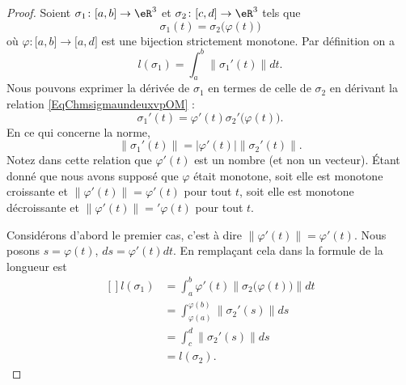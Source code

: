 \begin{proof}
    Soient $\sigma_1\colon \mathopen[ a , b \mathclose]\to \eR^3$ et $\sigma_2\colon \mathopen[ c , d \mathclose]\to \eR^3$ tels que
    \begin{equation}     \label{EqChmsigmaundeuxvpOM}
        \sigma_1(t)=\sigma_2\big( \varphi(t) \big)
    \end{equation}
    où $\varphi\colon \mathopen[ a , b \mathclose]\to \mathopen[ a , d \mathclose]$ est une bijection strictement monotone. Par définition on a
    \begin{equation}
        l(\sigma_1)=\int_a^b\| \sigma_1'(t) \|dt.
    \end{equation}
    Nous pouvons exprimer la dérivée de $\sigma_1$ en termes de celle de $\sigma_2$ en dérivant la relation \eqref{EqChmsigmaundeuxvpOM} :
    \begin{equation}
        \sigma_1'(t)=\varphi'(t)\sigma_2'\big( \varphi(t) \big).
    \end{equation}
    En ce qui concerne la norme,
    \begin{equation}
        \| \sigma_1'(t) \|=| \varphi'(t) |\| \sigma_2'(t) \|.
    \end{equation}
    Notez dans cette relation que $\varphi'(t)$ est un nombre (et non un vecteur). Étant donné que nous avons supposé que $\varphi$ était monotone, soit elle est monotone croissante et $\| \varphi'(t) \|=\varphi'(t)$ pour tout $t$, soit elle est monotone décroissante et $\| \varphi'(t) \|='\varphi(t)$ pour tout $t$.

    Considérons d'abord le premier cas, c'est à dire $\| \varphi'(t) \|=\varphi'(t)$. Nous posons $s=\varphi(t)$, $ds=\varphi'(t)dt$. En remplaçant cela dans la formule de la longueur est
    \begin{equation}
        \begin{aligned}[]
            l(\sigma_1)&=\int_a^b\varphi'(t)\| \sigma_2\big( \varphi(t) \big) \|dt\\
            &=\int_{\varphi(a)}^{\varphi(b)}\| \sigma_2'(s) \|ds\\
            &=\int_c^d\| \sigma_2'(s) \|ds\\
            &=l(\sigma_2).
        \end{aligned}
    \end{equation}
    

\end{proof}
